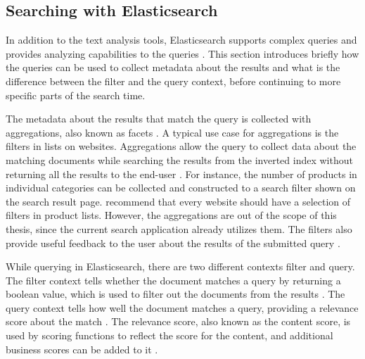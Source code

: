 

\subsection{Searching with Elasticsearch}
\label{ss:searchElasticsearch}


In addition to the text analysis tools, Elasticsearch supports complex queries and provides
analyzing capabilities to the queries \cite{elasticIntro}.
This section introduces briefly how the queries can be used to collect metadata about the results 
and what is the difference between the filter and the query context, 
before continuing to more specific parts of the search time.


The metadata about the results that match the query is collected with aggregations, 
also known as facets \cite{elasticIntro}.
A typical use case for aggregations is the filters in lists on websites.
Aggregations allow the query to collect data about the matching documents 
while searching the results from the inverted index without returning all the results to 
the end-user \cite{relevantSearch}.
For instance, the number of products in individual categories can be collected and constructed to 
a search filter shown on the search result page.
\citeauthor{relevantSearch} \cite{relevantSearch} recommend that every website should have
a selection of filters in product lists.
However, the aggregations are out of the scope of this thesis, since the current search application already
utilizes them.
The filters also provide useful feedback to the user about
the results of the submitted query \cite{relevantSearch}.


While querying in Elasticsearch, there are two different contexts filter and query. 
The filter context tells whether the document matches a query
by returning a boolean value, which is used to filter out the documents from the results \cite{elasticIntro}.
The query context tells how well the document matches a query,
providing a relevance score about the match \cite{elasticIntro}.
The relevance score, also known as the content score, is used by scoring functions
to reflect the score for the content, and additional business scores can be added to it \cite{elasticIntro}.

